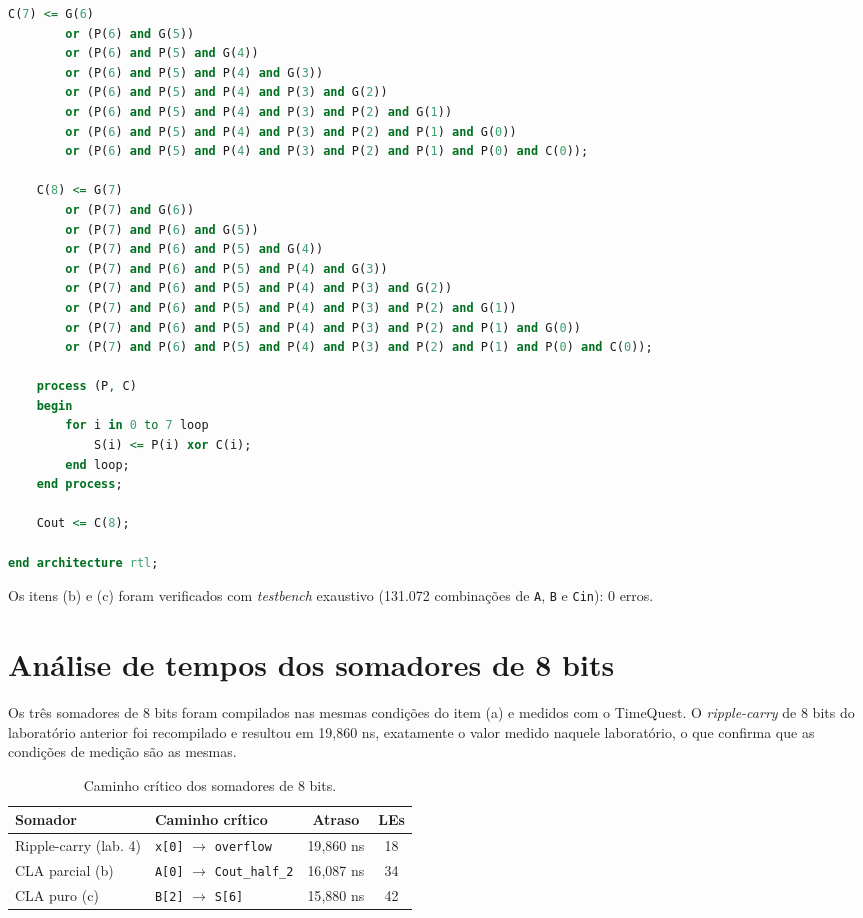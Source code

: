 \documentclass[report, 12pt]{uftreport}
\begin{document}
\begin{lstlisting}[language=VHDL]
    C(7) <= G(6)
        or (P(6) and G(5))
        or (P(6) and P(5) and G(4))
        or (P(6) and P(5) and P(4) and G(3))
        or (P(6) and P(5) and P(4) and P(3) and G(2))
        or (P(6) and P(5) and P(4) and P(3) and P(2) and G(1))
        or (P(6) and P(5) and P(4) and P(3) and P(2) and P(1) and G(0))
        or (P(6) and P(5) and P(4) and P(3) and P(2) and P(1) and P(0) and C(0));

    C(8) <= G(7)
        or (P(7) and G(6))
        or (P(7) and P(6) and G(5))
        or (P(7) and P(6) and P(5) and G(4))
        or (P(7) and P(6) and P(5) and P(4) and G(3))
        or (P(7) and P(6) and P(5) and P(4) and P(3) and G(2))
        or (P(7) and P(6) and P(5) and P(4) and P(3) and P(2) and G(1))
        or (P(7) and P(6) and P(5) and P(4) and P(3) and P(2) and P(1) and G(0))
        or (P(7) and P(6) and P(5) and P(4) and P(3) and P(2) and P(1) and P(0) and C(0));

    process (P, C)
    begin
        for i in 0 to 7 loop
            S(i) <= P(i) xor C(i);
        end loop;
    end process;

    Cout <= C(8);

end architecture rtl;
\end{lstlisting}

Os itens (b) e (c) foram verificados com \textit{testbench} exaustivo (131.072 combinações de \texttt{A}, \texttt{B} e \texttt{Cin}): 0 erros.

\section{Análise de tempos dos somadores de 8 bits}

Os três somadores de 8 bits foram compilados nas mesmas condições do item (a) e medidos com o TimeQuest. O \textit{ripple-carry} de 8 bits do laboratório anterior foi recompilado e resultou em 19{,}860 ns, exatamente o valor medido naquele laboratório, o que confirma que as condições de medição são as mesmas.

\begin{table}[htb]
  \centering
  \caption{Caminho crítico dos somadores de 8 bits.}
  \label{tab:tempos-8bits}
  \begin{tabular}{llcc}
    \toprule
    Somador & Caminho crítico & Atraso & LEs \\
    \midrule
    Ripple-carry (lab. 4) & \texttt{x[0]} $\rightarrow$ \texttt{overflow}    & 19{,}860 ns & 18 \\
    CLA parcial (b)       & \texttt{A[0]} $\rightarrow$ \texttt{Cout\_half\_2} & 16{,}087 ns & 34 \\
    CLA puro (c)          & \texttt{B[2]} $\rightarrow$ \texttt{S[6]}        & 15{,}880 ns & 42 \\
    \bottomrule
  \end{tabular}
\end{table}
\end{document}
